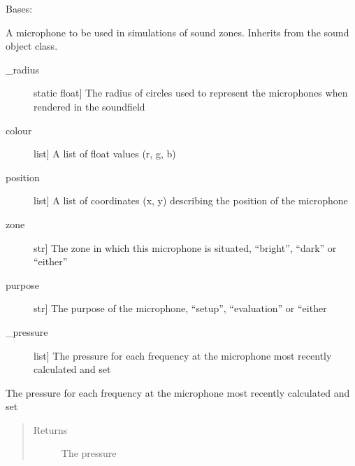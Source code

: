 \documentclass[letterpaper,10pt,english]{sphinxmanual}
\begin{document}

\begin{fulllineitems}
\label{\detokenize{source/pyzones:pyzones.Microphone}}
Bases: {\hyperref[\detokenize{source/pyzones:pyzones.SoundObject}]{}}

A microphone to be used in simulations of sound zones. Inherits from the sound object class.
\begin{description}
\item[{\_radius}] \leavevmode{[}static float{]}
The radius of circles used to represent the microphones when rendered in the soundfield

\end{description}
\begin{description}
\item[{colour}] \leavevmode{[}list{]}
A list of float values (r, g, b)

\item[{position}] \leavevmode{[}list{]}
A list of coordinates (x, y) describing the position of the microphone

\item[{zone}] \leavevmode{[}str{]}
The zone in which this microphone is situated, “bright”, “dark” or “either”

\item[{purpose}] \leavevmode{[}str{]}
The purpose of the microphone, “setup”, “evaluation” or “either

\item[{\_pressure}] \leavevmode{[}list{]}
The pressure for each frequency at the microphone most recently calculated and set

\end{description}

\begin{fulllineitems}
\label{\detokenize{source/pyzones:pyzones.Microphone.pressure}}
The pressure for each frequency at the microphone most recently calculated and set
\begin{quote}\begin{description}
\item[{Returns}] \leavevmode
The pressure


\end{description}
\end{quote}
\end{fulllineitems}
\end{fulllineitems}
\end{document}
